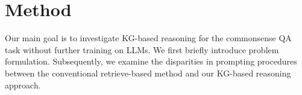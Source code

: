 \documentclass{article}
\begin{document}

\section{Method}
Our main goal is to investigate KG-based reasoning for the commonsense QA task without further training on LLMs. We first briefly introduce problem formulation. Subsequently, we examine the disparities in prompting procedures between the conventional retrieve-based method and our KG-based reasoning approach.

\end{document}

